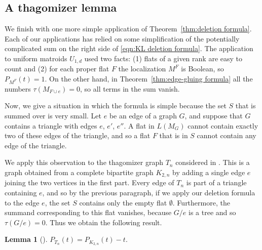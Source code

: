 \documentclass[12pt,reqno]{amsart}
\theoremstyle{definition}
\newtheorem{lemma}[theorem]{Lemma}
\theoremstyle{remark}
\renewcommand{\(}{\left(}
\renewcommand{\)}{\right)}
\newcommand{\<}{\left<}
\renewcommand{\>}{\right>}
\begin{document}
\subsection{A thagomizer lemma}

We finish with one more simple application of Theorem~\ref{thm:deletion formula}.  Each of our applications has relied on some simplification of the potentially complicated sum on the right side of \eqref{eqn:KL deletion formula}.  
The application to uniform matroids $U_{1,d}$ used two facts: (1) flats of a given rank are easy to count and (2) for each proper flat $F$ the localization $M^F$ is Boolean, so $P_{M^F}(t) = 1$.  On the other hand, in Theorem~\ref{thm:edge-gluing formula} all the numbers $\tau(M_{F\cup e})=0$, so all terms in the sum vanish.

Now, we give a situation in which the formula is simple because the set $S$ that is summed over is very small.  
Let $e$ be an edge of a graph $G$, and suppose that 
$G$ contains a triangle with edges $e$, $e'$, $e''$. A flat in $L(M_G)$ cannot contain exactly two of these edges of the triangle, and so a flat $F$ that is in $S$ cannot contain any edge of the triangle.

We apply this observation to the thagomizer graph $T_n$ considered in \cite{G}. This is a graph obtained from a complete bipartite graph $K_{2,n}$ by adding a single edge $e$ joining the two vertices in the first part.  Every edge of $T_n$ is part of a triangle containing $e$, and so by the previous paragraph, if we apply our deletion formula to the edge $e$, the set $S$ contains only the empty flat $\emptyset$.  Furthermore, the summand corresponding to this flat vanishes, because $G/e$ is a tree and so $\tau(G/e)=0$.  Thus we obtain the following result.

\begin{lemma}[]
$P_{T_n}(t) = P_{K_{2,n}}(t) - t$.
\end{lemma}


%
%
\end{document}
